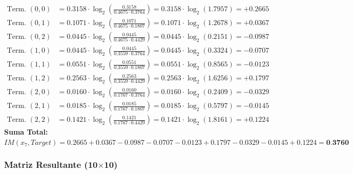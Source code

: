 \documentclass[12pt,a4paper]{article}
\begin{document}
\begin{align*}
    \text{Term. } (0,0) &= 0.3158 \cdot \log_2\left(\frac{0.3158}{0.4675 \cdot 0.3764}\right) = 0.3158 \cdot \log_2(1.7957) = \mathbf{+0.2665} \\
    \text{Term. } (0,1) &= 0.1071 \cdot \log_2\left(\frac{0.1071}{0.4675 \cdot 0.1807}\right) = 0.1071 \cdot \log_2(1.2678) = \mathbf{+0.0367} \\
    \text{Term. } (0,2) &= 0.0445 \cdot \log_2\left(\frac{0.0445}{0.4675 \cdot 0.4429}\right) = 0.0445 \cdot \log_2(0.2151) = \mathbf{-0.0987} \\
    \text{Term. } (1,0) &= 0.0445 \cdot \log_2\left(\frac{0.0445}{0.3559 \cdot 0.3764}\right) = 0.0445 \cdot \log_2(0.3324) = \mathbf{-0.0707} \\
    \text{Term. } (1,1) &= 0.0551 \cdot \log_2\left(\frac{0.0551}{0.3559 \cdot 0.1807}\right) = 0.0551 \cdot \log_2(0.8565) = \mathbf{-0.0123} \\
    \text{Term. } (1,2) &= 0.2563 \cdot \log_2\left(\frac{0.2563}{0.3559 \cdot 0.4429}\right) = 0.2563 \cdot \log_2(1.6256) = \mathbf{+0.1797} \\
    \text{Term. } (2,0) &= 0.0160 \cdot \log_2\left(\frac{0.0160}{0.1767 \cdot 0.3764}\right) = 0.0160 \cdot \log_2(0.2409) = \mathbf{-0.0329} \\
    \text{Term. } (2,1) &= 0.0185 \cdot \log_2\left(\frac{0.0185}{0.1767 \cdot 0.1807}\right) = 0.0185 \cdot \log_2(0.5797) = \mathbf{-0.0145} \\
    \text{Term. } (2,2) &= 0.1421 \cdot \log_2\left(\frac{0.1421}{0.1767 \cdot 0.4429}\right) = 0.1421 \cdot \log_2(1.8161) = \mathbf{+0.1224}
\end{align*}
\textbf{Suma Total:} $IM(x_7, Target) = 0.2665 + 0.0367 - 0.0987 - 0.0707 - 0.0123 + 0.1797 - 0.0329 - 0.0145 + 0.1224 = \textbf{0.3760}$

\subsubsection{Matriz Resultante (10$\times$10)}
\end{document}
